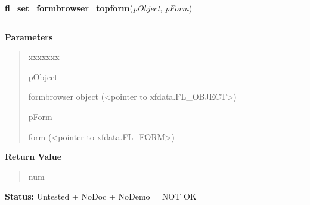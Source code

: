 \hspace{.8\funcindent}\begin{boxedminipage}{\funcwidth}

    \raggedright \textbf{fl\_set\_formbrowser\_topform}(\textit{pObject}, \textit{pForm})

    \vspace{-1.5ex}

    \rule{\textwidth}{0.5\fboxrule}
\setlength{\parskip}{2ex}
\setlength{\parskip}{1ex}
      \textbf{Parameters}
      \vspace{-1ex}

      \begin{quote}
        \begin{Ventry}{xxxxxxx}

          \item[pObject]

          formbrowser object ({\textless}pointer to 
          xfdata.FL\_OBJECT{\textgreater})

          \item[pForm]

          form ({\textless}pointer to xfdata.FL\_FORM{\textgreater})

        \end{Ventry}

      \end{quote}

      \textbf{Return Value}
    \vspace{-1ex}

      \begin{quote}
      num

      \end{quote}

\textbf{Status:} Untested + NoDoc + NoDemo = NOT OK



    \end{boxedminipage}

    \label{xformslib:library:fl_set_formbrowser_topform_bynumber}

    \vspace{0.5ex}

